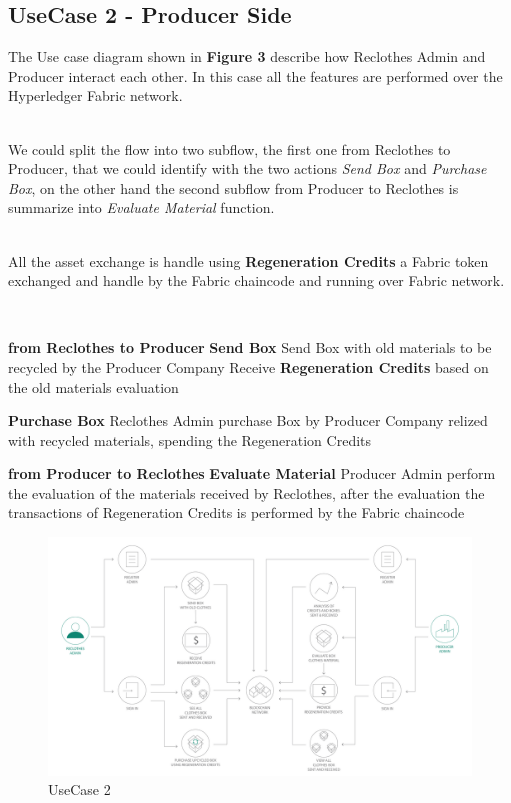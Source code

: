 {\subsection{UseCase 2 - Producer Side}

The Use case diagram shown in \textbf{Figure 3} describe how Reclothes Admin and Producer interact each other.
In this case all the features are performed over the Hyperledger Fabric network.

\newline \\
We could split the flow into two subflow, the first one from Reclothes to Producer, that we could identify
with the two actions \textit{Send Box} and \textit{Purchase Box}, on the other hand the second subflow
from Producer to Reclothes is summarize into \textit{Evaluate Material} function. 

\newline \\
All the asset exchange is handle using \textbf{Regeneration Credits} a Fabric token exchanged
and handle by the Fabric chaincode and running over Fabric network.

\\
\begin{outline}[enumerate]
    \1 \textbf{from Reclothes to Producer}   
    \2 \textbf{Send Box}
    \3 Send Box with old materials to be recycled by the Producer Company
    \3 Receive \textbf{Regeneration Credits} based on the old materials evaluation
    
    \2 \textbf{Purchase Box}
    \3 Reclothes Admin purchase Box by Producer Company relized with recycled materials, spending the
    Regeneration Credits
    
    \1 \textbf{from Producer to Reclothes}
    \2 \textbf{Evaluate Material}
    \3 Producer Admin perform the evaluation of the materials received by Reclothes, after the evaluation
    the transactions of Regeneration Credits is performed by the Fabric chaincode
\end{outline}


\begin{figure}[h!]
	\centering
	\includegraphics[totalheight=10cm]{img/use_case2.png}
	\caption{UseCase 2}
	\label{fig:usecase2}
\end{figure}


}
